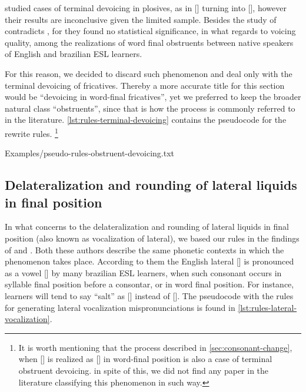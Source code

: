 \citeauthor{Albuquerque2011} \citep{Albuquerque2011} studied cases of terminal devoicing in plosives, as in [] 
turning into [], however their results are inconclusive given the limited sample. 
Besides the study of \citeauthor{Zimmer2012} contradicts \citeauthor{Albuquerque2011} \citep{Albuquerque2011}, for they found 
no statistical significance, in what regards to voicing quality, among the realizations of word final obstruents
between native speakers of English and brazilian \ac{ESL} learners.

For this reason, we decided to discard such phenomenon and deal only with the terminal devoicing of fricatives.
Thereby a more accurate title for this section would be ``devoicing in word-final fricatives'', yet we 
preferred to keep the broader natural class ``obstruents'', since that is how the process is commonly referred to in the literature. 
\autoref{lst:rules-terminal-devoicing} contains the pseudocode for the rewrite rules.
\footnote{It is worth mentioning that the process described in \autoref{sec:consonant-change}, when [] is realized as
[] in word-final position is also a case of terminal obstruent devoicing. in spite of this, we did not
find any paper in the literature classifying this phenomenon in such way.}

%
    {Examples/pseudo-rules-obstruent-devoicing.txt}

\clearpage    
\subsection{Delateralization and rounding of lateral liquids in final position}
In what concerns to the delateralization and rounding of lateral liquids in final position (also known as vocalization of lateral), we based
our rules in the findings of \citeauthor{Baratieri2006} \citep{Baratieri2006} and \citeauthor{Moore2008} \citep{Moore2008}. Both these authors
describe the same phonetic contexts in which the phenomenon takes place. According to them the English lateral [] is
pronounced as a vowel [] by many brazilian \ac{ESL} learners, when such consonant occurs in syllable final position before
a consontar, or in word final position. For instance, learners will tend to say ``salt'' as [] instead of [].
The pseudocode with the rules for generating lateral vocalization mispronunciations is found in \autoref{lst:rules-lateral-vocalization}.

